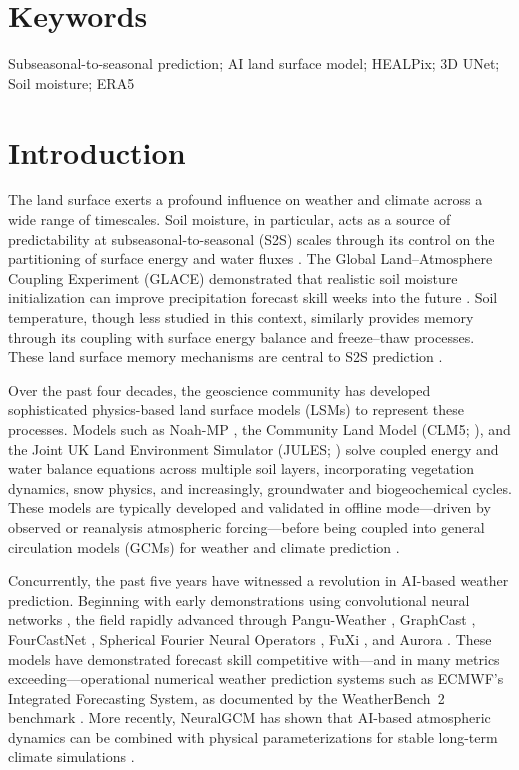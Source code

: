 \documentclass[11pt]{article}
\begin{document}
\section*{Keywords}
Subseasonal-to-seasonal prediction; AI land surface model; HEALPix; 3D UNet; Soil moisture; ERA5

\section{Introduction}
\label{sec:intro}

The land surface exerts a profound influence on weather and climate across a wide range of timescales. Soil moisture, in particular, acts as a source of predictability at subseasonal-to-seasonal (S2S) scales through its control on the partitioning of surface energy and water fluxes \citep{koster2004glace, seneviratne2010landclimate, dirmeyer2011landatm}. The Global Land--Atmosphere Coupling Experiment (GLACE) demonstrated that realistic soil moisture initialization can improve precipitation forecast skill weeks into the future \citep{koster2004glace}. Soil temperature, though less studied in this context, similarly provides memory through its coupling with surface energy balance and freeze--thaw processes. These land surface memory mechanisms are central to S2S prediction \citep{vitart2017s2s, merryfield2020s2s}.

Over the past four decades, the geoscience community has developed sophisticated physics-based land surface models (LSMs) to represent these processes. Models such as Noah-MP \citep{niu2011noahmp, ek2003noah}, the Community Land Model (CLM5; \citealt{lawrence2019clm5}), and the Joint UK Land Environment Simulator (JULES; \citealt{best2011jules}) solve coupled energy and water balance equations across multiple soil layers, incorporating vegetation dynamics, snow physics, and increasingly, groundwater and biogeochemical cycles. These models are typically developed and validated in offline mode---driven by observed or reanalysis atmospheric forcing---before being coupled into general circulation models (GCMs) for weather and climate prediction \citep{bauer2015quietrev}.

Concurrently, the past five years have witnessed a revolution in AI-based weather prediction. Beginning with early demonstrations using convolutional neural networks \citep{weyn2019dlwp, weyn2020dlwpcs}, the field rapidly advanced through Pangu-Weather \citep{bi2023pangu}, GraphCast \citep{lam2023graphcast}, FourCastNet \citep{pathak2022fourcastnet}, Spherical Fourier Neural Operators \citep{bonev2023sfno}, FuXi \citep{chen2023fuxi}, and Aurora \citep{bodnar2024aurora}. These models have demonstrated forecast skill competitive with---and in many metrics exceeding---operational numerical weather prediction systems such as ECMWF's Integrated Forecasting System, as documented by the WeatherBench~2 benchmark \citep{rasp2024weatherbench2}. More recently, NeuralGCM has shown that AI-based atmospheric dynamics can be combined with physical parameterizations for stable long-term climate simulations \citep{kochkov2024neuralGCM}.
\end{document}
